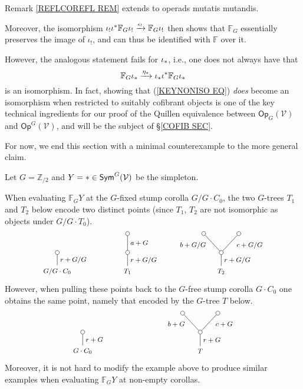 \documentclass[a4paper,10pt]{article}%
\begin{document}
\begin{remark}
	Remark \ref{REFLCOREFL REM} extends to operads mutatis mutandis.
	
Moreover, the isomorphism
	$\iota_{!}\iota^{\**} \mathbb{F}_G \iota_{!}
	\xrightarrow{\epsilon_!}
	\mathbb{F}_G \iota_{!}$
then shows that $\mathbb{F}_G$ essentially preserves the image of $\iota_!$, and can thus be identified with $\mathbb{F}$ over it.

However, the analogous statement fails for $\iota_{\**}$, i.e., one does not always have that
\begin{equation}\label{KEYNONISO EQ}
	\mathbb{F}_G \iota_{\**}
	\xrightarrow{\eta_{\**}}
	\iota_{\**}\iota^{\**} \mathbb{F}_G \iota_{\**}
\end{equation}
is an isomorphism. 
In fact, showing that (\ref{KEYNONISO EQ})
\textit{does} become an isomorphism when restricted to suitably cofibrant objects is one of the key technical ingredients for our proof of the Quillen equivalence between 
$\mathsf{Op}_G(\mathcal{V})$ and
$\mathsf{Op}^G(\mathcal{V})$, 
and will be the subject of \S \ref{COFIB SEC}.

For now, we end this section with a minimal counterexample to  the more general claim.

Let $G=\mathbb{Z}_{/2}$ and 
$Y=\** \in \mathsf{Sym}^G(\mathcal{V})$ be the simpleton.

	When evaluating $\mathbb{F}_G Y$ at the $G$-fixed stump corolla $G/G \cdot C_0$, the two $G$-trees $T_1$ and $T_2$ below encode two distinct points (since $T_1$, $T_2$ are not isomorphic as objects under $G/G\cdot T_0$).
\[
\begin{tikzpicture}[grow=up,auto,level distance=2.3em,every node/.style = {font=\footnotesize},dummy/.style={circle,draw,inner sep=0pt,minimum size=1.75mm}]
	\node at (0,0) {$G/G \cdot C_0$}
		child{
			node [dummy] {}
		edge from parent node [swap] {$r+G/G$}};
	\node at (3,0) {$T_1$}
		child{node [dummy] {}
			child{node [dummy] {}
			edge from parent node [swap] {$a+G$}}
		edge from parent node [swap] {$r+G/G$}};
	\node at (7,0) {$T_2$}
		child{node [dummy] {}
			child{node [dummy] {}
			edge from parent node [swap,near end] {$c+G/G$}}
			child{node [dummy] {}
			edge from parent node [near end] {$b+G/G$}}
		edge from parent node [swap] {$r+G/G$}};
\end{tikzpicture}
\]
However, when pulling these points back to the $G$-free stump corolla $G \cdot C_0$ one obtains the same point, namely that encoded by the $G$-tree $T$ below.
\[
\begin{tikzpicture}[grow=up,auto,level distance=2.3em,every node/.style = {font=\footnotesize},dummy/.style={circle,draw,inner sep=0pt,minimum size=1.75mm}]
	\node at (0,0) {$G \cdot C_0$}
		child{
			node [dummy] {}
		edge from parent node [swap] {$r+G$}};
	\node at (5,0) {$T$}
		child{node [dummy] {}
			child{node [dummy] {}
			edge from parent node [swap,near end] {$c+G$}}
			child{node [dummy] {}
			edge from parent node [near end] {$b+G$}}
		edge from parent node [swap] {$r+G$}};
\end{tikzpicture}
\]
Moreover, it is not hard to modify the example above to produce similar examples when evaluating $\mathbb{F}_GY$ at non-empty corollas. 


\end{remark}
\end{document}
